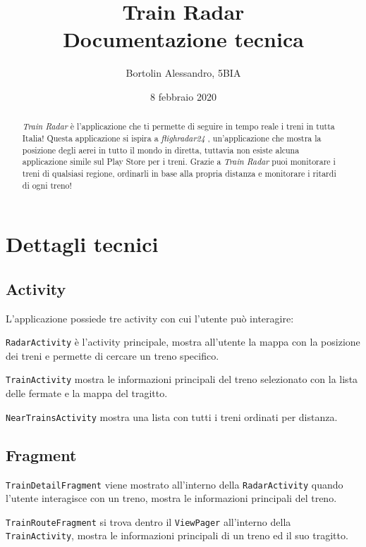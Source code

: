 \documentclass[a4paper,10pt]{article}
\title{Train Radar \\ Documentazione tecnica}
\author{Bortolin Alessandro, 5BIA}
\date{8 febbraio 2020}
\begin{document}
\maketitle

\begin{abstract}
  \emph{Train Radar} è l'applicazione che ti permette di seguire in tempo reale i treni in tutta Italia! Questa applicazione si ispira a \emph{flighradar24} \cite{flighradar}, un'applicazione che mostra la posizione degli aerei in tutto il mondo in diretta, tuttavia non esiste alcuna applicazione simile sul Play Store per i treni. Grazie a \emph{Train Radar} puoi monitorare i treni di qualsiasi regione, ordinarli in base alla propria distanza e monitorare i ritardi di ogni treno!
\end{abstract}

\section{Dettagli tecnici}

  \subsection{Activity}
    L'applicazione possiede tre activity con cui l'utente può interagire:

    \medskip
    \noindent
    \texttt{RadarActivity} è l'activity principale, mostra all'utente la mappa con la posizione dei treni e permette di cercare un treno specifico.

    \medskip
    \noindent
    \texttt{TrainActivity} mostra le informazioni principali del treno selezionato con la lista delle fermate e la mappa del tragitto.

    \medskip
    \noindent
    \texttt{NearTrainsActivity} mostra una lista con tutti i treni ordinati per distanza.

  \subsection{Fragment}
    \medskip
    \noindent
    \texttt{TrainDetailFragment} viene mostrato all'interno della \texttt{RadarActivity} quando l'utente interagisce con un treno, mostra le informazioni principali del treno.

    \medskip
    \noindent
    \texttt{TrainRouteFragment} si trova dentro il \texttt{ViewPager} all'interno della \texttt{TrainActivity}, mostra le informazioni principali di un treno ed il suo tragitto.
\end{document}
